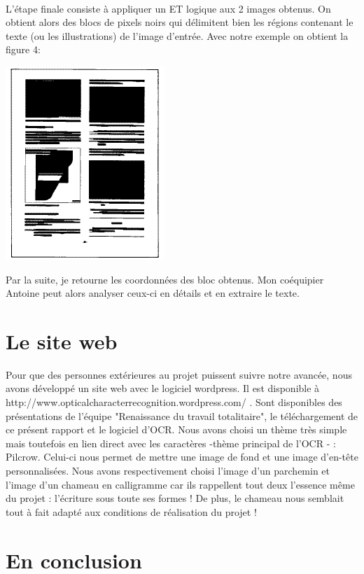 \documentclass [french,12pt]{article}
\begin{document}
\\
L'étape finale consiste à appliquer un ET logique aux 2 images obtenus. On obtient alors des blocs de pixels noirs qui délimitent bien les régions contenant le texte (ou les illustrations) de l'image d'entrée. Avec notre exemple on obtient la figure 4:

\begin{center} \includegraphics[scale=0.4]{rlsa_fig4} \end{center}

Par la suite, je retourne les coordonnées des bloc obtenus.
Mon coéquipier Antoine peut alors analyser ceux-ci en détails et en extraire le texte.

\section{Le site web}
Pour que des personnes extérieures au projet puissent suivre notre avancée, nous avons développé un site web avec le logiciel wordpress. Il est disponible à http://www.opticalcharacterrecognition.wordpress.com/ . Sont disponibles des présentations de l'équipe "Renaissance du travail totalitaire", le téléchargement de ce présent rapport et le logiciel d'OCR. Nous avons choisi un thème très simple mais toutefois en lien direct avec les caractères -thème principal de l'OCR - : Pilcrow. Celui-ci nous permet de mettre une image de fond et une image d'en-tête personnalisées. Nous avons respectivement choisi l'image d'un parchemin et l'image d'un chameau en calligramme car ils rappellent tout deux l'essence même du projet : l'écriture sous toute ses formes ! De plus, le chameau nous semblait tout à fait adapté aux conditions de réalisation du projet ! 


\section{En conclusion}
\end{document}
